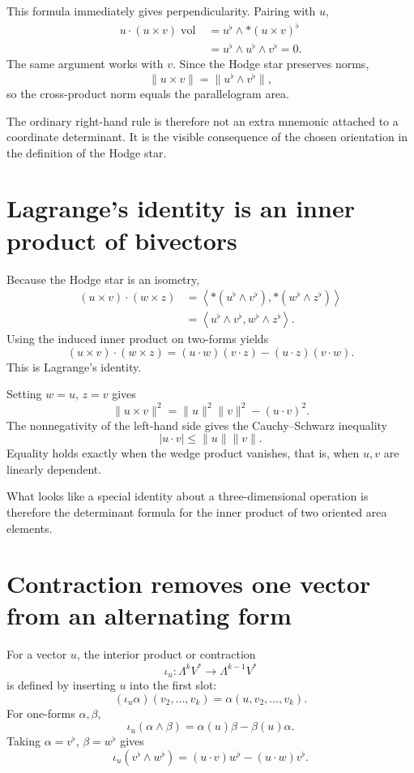 This formula immediately gives perpendicularity.  Pairing with \(u\),
\[
\begin{aligned}
  u\cdot(u\times v)\operatorname{vol}
  &=u^{\flat}\wedge*(u\times v)^{\flat}\\
  &=u^{\flat}\wedge u^{\flat}\wedge v^{\flat}=0.
\end{aligned}
\]
The same argument works with \(v\).  Since the Hodge star preserves norms,
\[
  \|u\times v\|
  =\|u^{\flat}\wedge v^{\flat}\|,
\]
so the cross-product norm equals the parallelogram area.

The ordinary right-hand rule is therefore not an extra mnemonic attached to a coordinate determinant.  It is the visible consequence of the chosen orientation in the definition of the Hodge star.

\section{Lagrange's identity is an inner product of bivectors}

Because the Hodge star is an isometry,
\[
\begin{aligned}
  (u\times v)\cdot(w\times z)
  &=\left\langle
  *(u^{\flat}\wedge v^{\flat}),
  *(w^{\flat}\wedge z^{\flat})
  \right\rangle\\
  &=\left\langle
  u^{\flat}\wedge v^{\flat},
  w^{\flat}\wedge z^{\flat}
  \right\rangle.
\end{aligned}
\]
Using the induced inner product on two-forms yields
\[
  \boxed{
  (u\times v)\cdot(w\times z)
  =(u\cdot w)(v\cdot z)
  -(u\cdot z)(v\cdot w).}
\]
This is Lagrange's identity.

Setting \(w=u\), \(z=v\) gives
\[
  \|u\times v\|^2
  =\|u\|^2\|v\|^2-(u\cdot v)^2.
\]
The nonnegativity of the left-hand side gives the Cauchy--Schwarz inequality
\[
  |u\cdot v|\le\|u\|\|v\|.
\]
Equality holds exactly when the wedge product vanishes, that is, when \(u,v\) are linearly dependent.

What looks like a special identity about a three-dimensional operation is therefore the determinant formula for the inner product of two oriented area elements.

\section{Contraction removes one vector from an alternating form}

For a vector \(u\), the interior product or contraction
\[
  \iota_u:\Lambda^kV^*\to\Lambda^{k-1}V^*
\]
is defined by inserting \(u\) into the first slot:
\[
  (\iota_u\alpha)(v_2,\ldots,v_k)
  =\alpha(u,v_2,\ldots,v_k).
\]
For one-forms \(\alpha,\beta\),
\[
  \iota_u(\alpha\wedge\beta)
  =\alpha(u)\beta-\beta(u)\alpha.
\]
Taking \(\alpha=v^{\flat}\), \(\beta=w^{\flat}\) gives
\[
  \iota_u(v^{\flat}\wedge w^{\flat})
  =(u\cdot v)w^{\flat}-(u\cdot w)v^{\flat}.
\]

